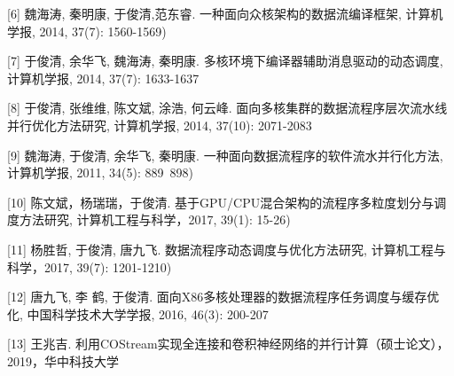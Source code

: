 [6] 魏海涛, 秦明康, 于俊清,范东睿. 一种面向众核架构的数据流编译框架, 计算机学报, 2014, 37(7): 1560-1569)

[7] 于俊清, 余华飞, 魏海涛, 秦明康. 多核环境下编译器辅助消息驱动的动态调度, 计算机学报, 2014, 37(7): 1633-1637

[8] 于俊清, 张维维, 陈文斌, 涂浩, 何云峰. 面向多核集群的数据流程序层次流水线并行优化方法研究, 计算机学报, 2014, 37(10): 2071-2083

[9] 魏海涛, 于俊清, 余华飞, 秦明康. 一种面向数据流程序的软件流水并行化方法, 计算机学报, 2011, 34(5): 889~898)

[10] 陈文斌，杨瑞瑞，于俊清. 基于GPU/CPU混合架构的流程序多粒度划分与调度方法研究, 计算机工程与科学，2017, 39(1): 15-26)

[11] 杨胜哲, 于俊清, 唐九飞. 数据流程序动态调度与优化方法研究, 计算机工程与科学，2017, 39(7): 1201-1210)

[12] 唐九飞, 李 鹤, 于俊清. 面向X86多核处理器的数据流程序任务调度与缓存优化, 中国科学技术大学学报, 2016, 46(3): 200-207

[13] 王兆吉. 利用COStream实现全连接和卷积神经网络的并行计算（硕士论文），2019，华中科技大学